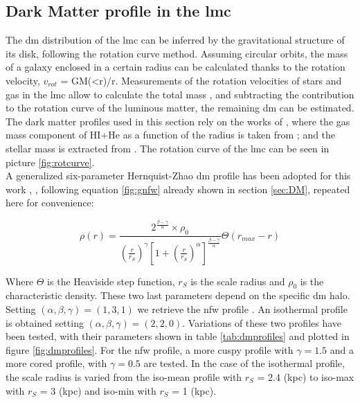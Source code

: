 \documentclass[main.tex]{subfiles}
\begin{document}
\subsection{Dark Matter profile in the \gls{lmc}}

The \gls{dm} distribution of the \gls{lmc} can be inferred by the gravitational structure of its disk, following the rotation curve method. Assuming circular orbits, the mass of a galaxy enclosed in a certain radius can be calculated thanks to the rotation velocity, $v_{rot}$ = GM(<r)/r. Measurements of the rotation velocities of stars and gas in the \gls{lmc} allow to calculate the total mass \cite{LMCHI}, and subtracting the contribution to the rotation curve of the luminous matter, the remaining \gls{dm} can be estimated. The dark matter profiles used in this section rely on the works of \cite{2015FermiLMCDM}, where the gas mass component of HI+He as a function of the radius is taken from \cite{1992gasLMC}; and the stellar mass is extracted from \cite{2006LMCkinematics}. The rotation curve of the \gls{lmc} can be seen in picture \ref{fig:rotcurve}.\\
A generalized six-parameter Hernquist-Zhao \gls{dm} profile has been adopted for this work \cite{1990Hernquist}, \cite{1996Zhao}, following equation \ref{fig:gnfw} already shown in section \ref{sec:DM}, repeated here for convenience:


\begin{equation}
    \rho(r) = \frac{2^{\frac{\beta-\gamma}{\alpha}} \times \rho_{0}}{\left(\frac{r}{r_{S}}\right)^{\gamma}\left[ 1+\left(\frac{r}{r_{S}} \right)^{\alpha}\right]^{\frac{\beta-\gamma}{\alpha}}}\Theta(r_{max}-r)
\end{equation} \label{fig:gnfw}

Where $\Theta$ is the Heaviside step function, $r_{S}$ is the scale radius and $\rho_{0}$ is the characteristic density. These two last parameters depend on the specific \gls{dm} halo. Setting $(\alpha,\beta,\gamma) = (1,3,1)$ we retrieve the \gls{nfw} profile \cite{NFW}. An isothermal profile is obtained setting $(\alpha,\beta,\gamma) = (2,2,0)$. Variations of these two profiles have been tested, with their parameters shown in table \ref{tab:dmprofiles} and plotted in figure \ref{fig:dmprofiles}. For the \gls{nfw} profile, a more cuspy profile with $\gamma=1.5$ and a more cored profile, with $\gamma=0.5$ are tested. In the case of the isothermal profile, the scale radius is varied from the iso-mean profile with $r_{S}$ = 2.4 (kpc) to iso-max with $r_{S}$ = 3 (kpc) and iso-min with $r_{S}$ = 1 (kpc).
\end{document}
